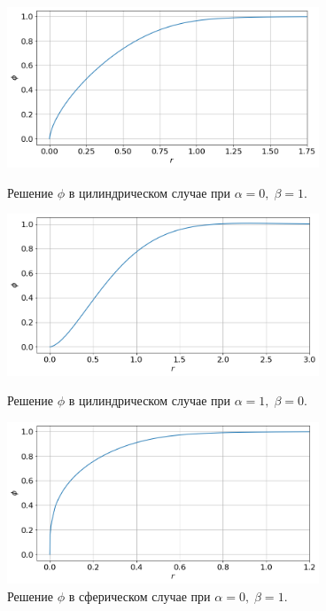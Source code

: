 \begin{figure}[!tp]
	\centering
	\includegraphics[width=0.83\textwidth]{figures/result_volumes_cyl_p.png}
	\vspace{-0.4cm}
	\caption{Решение $\phi$ в цилиндрическом случае при $\alpha = 0, \; \beta = 1$.}
	\label{fig:result_volumes_cyl_p}
	\vspace{0.5cm}

	\includegraphics[width=0.83\textwidth]{figures/result_volumes_cyl_bi.png}
	\vspace{-0.4cm}
	\caption{Решение $\phi$ в цилиндрическом случае при $\alpha = 1, \; \beta = 0$.}
	\label{fig:result_volumes_cyl_bi}
	\vspace{0.5cm}
	
	\includegraphics[width=0.83\textwidth]{figures/result_volumes_sph_p.png}
	\vspace{-0.4cm}
	\caption{Решение $\phi$ в сферическом случае при $\alpha = 0, \; \beta = 1$.}
	\label{fig:result_volumes_sph_p}
\end{figure}

